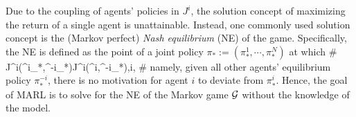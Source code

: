 Due to the coupling of agents' policies in $J^i$, the  solution concept of maximizing the return of a single agent is unattainable. Instead, one commonly used solution concept is the (Markov perfect) \emph{Nash equilibrium} (NE) of the game. Specifically, the NE is defined as the point of a joint policy $\pi_*:=(\pi_*^1,\cdots,\pi_*^N)$ at which 
\#\label{equ:def_NE}
J^i(\pi^i_*,\pi^{-i}_*)\geq J^i(\pi^i,\pi^{-i}_*),\quad \forall i\in\cN,
\#
namely, given all other agents' equilibrium policy $\pi^{-i}_*$, there is no motivation for agent $i$ to deviate from $\pi^{i}_*$. Hence, the goal of MARL is to solve for the NE of the Markov game $\mathcal{G}$ without the knowledge of the model.  
  


\begin{comment}
On the other hand,  if all the opponents policy $\pi^{-i}$ is fixed, the problem for agent $i$ reduces to a single-agent decision-making problem $\cM^i:=\la\cS,\cA^i,\tilde R^i,\tilde P^i,\gamma\ra$, where 
\$ 
\tilde R^i(s,a^i)&:=\int_{\cA^{-i}}R^i(s,a^i,a^{-i})\pi^{-i}(a^{-i}\given s)da^{-i}\\
\tilde P^i(\cdot\given s,a^i)&:=\int_{\cA^{-i}}P(\cdot\given s,a^i,a^{-i})\pi^{-i}(a^{-i}\given s)da^{-i}.
\$
To simplify the notation, we also define the \emph{best-response} operator $\cB^i:\Pi^{-i}\to\Pi^i$, where $\Pi^{i}$ represents the policy space for agent $i$, as follows:
\$
\cB^i(\pi^{-i}):=\argmax_{\pi^i}~~J^i(\pi^i,\pi^{-i}). 
\$
Let $\cB:=(\cB^1,\cdots,\cB^N)$, then the NE is the fixed point of the operator $\cB$, i.e., 
$\pi_*=\cB(\pi_*)$. In addition, viewing the NE using the best-response operator motivates the use of \emph{opponent-modeling} in the algorithm design later. 
   

\subsection{Multi-Car Racing for DeepRacer} \label{sec:multi_car_racing}
In general, multi-car racing with the current DeepRacer system configuration can be modeled as a Markov game with partial-observability. For notational simplicity, we consider the setting with only two cars\footnote{Note that our formulation  and algorithm design later can  be readily generalized to the setting with $N>2$ cars.}. 
Specifically, the state  $s=(s^1,s^2)$ is the position of both cars on the track, where $s^i=(x^i,y^i)$ denotes the coordinates of the car $i$ on the map. The action of each car $i$ is its velocity $a^i=v^i=(v_x^i,v_y^i)$.  The transition probability model is the physical model that deterministically  describes the advance of all cars, i.e., 
\$
s^i_{t+1}=s^i_{t}+\Delta t*(a^i_t).
\$
Each car has its own reward function $R^i(s,a^1,a^2)$, which characterizes the goal of both finishing the racing as soon as possible and avoiding collision with the opponent during racing. 
Note that both goals are dependent on the state and joint action of both agents. 
Details of engineering the reward function can be found in the quip document \cite{reward_design_quip} and will not be discussed here. 


\end{comment}
